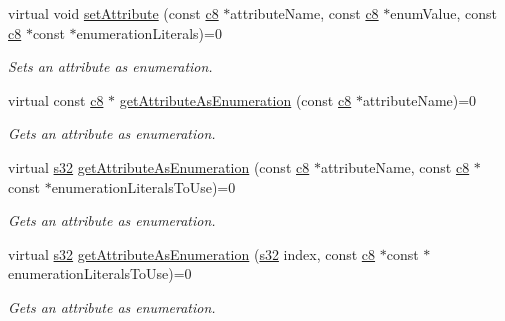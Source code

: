 \begin{DoxyCompactItemize}
\mbox{\label{classirr_1_1io_1_1IAttributes_a4670e9270e610770245b2109c2b49597}} 
virtual void \hyperlink{classirr_1_1io_1_1IAttributes_a4670e9270e610770245b2109c2b49597}{set\+Attribute} (const \hyperlink{namespaceirr_a9395eaea339bcb546b319e9c96bf7410}{c8} $\ast$attribute\+Name, const \hyperlink{namespaceirr_a9395eaea339bcb546b319e9c96bf7410}{c8} $\ast$enum\+Value, const \hyperlink{namespaceirr_a9395eaea339bcb546b319e9c96bf7410}{c8} $\ast$const $\ast$enumeration\+Literals)=0
\begin{DoxyCompactList}\small\item\em Sets an attribute as enumeration. \end{DoxyCompactList}\item 
virtual const \hyperlink{namespaceirr_a9395eaea339bcb546b319e9c96bf7410}{c8} $\ast$ \hyperlink{classirr_1_1io_1_1IAttributes_a2a204c332735a0b15fa555ae6e785214}{get\+Attribute\+As\+Enumeration} (const \hyperlink{namespaceirr_a9395eaea339bcb546b319e9c96bf7410}{c8} $\ast$attribute\+Name)=0
\begin{DoxyCompactList}\small\item\em Gets an attribute as enumeration. \end{DoxyCompactList}\item 
virtual \hyperlink{namespaceirr_ac66849b7a6ed16e30ebede579f9b47c6}{s32} \hyperlink{classirr_1_1io_1_1IAttributes_a77c6a5fba661a85701986382df7d13b3}{get\+Attribute\+As\+Enumeration} (const \hyperlink{namespaceirr_a9395eaea339bcb546b319e9c96bf7410}{c8} $\ast$attribute\+Name, const \hyperlink{namespaceirr_a9395eaea339bcb546b319e9c96bf7410}{c8} $\ast$const $\ast$enumeration\+Literals\+To\+Use)=0
\begin{DoxyCompactList}\small\item\em Gets an attribute as enumeration. \end{DoxyCompactList}\item 
virtual \hyperlink{namespaceirr_ac66849b7a6ed16e30ebede579f9b47c6}{s32} \hyperlink{classirr_1_1io_1_1IAttributes_a906b34ac742d3418d16afcf1d1e2aaa4}{get\+Attribute\+As\+Enumeration} (\hyperlink{namespaceirr_ac66849b7a6ed16e30ebede579f9b47c6}{s32} index, const \hyperlink{namespaceirr_a9395eaea339bcb546b319e9c96bf7410}{c8} $\ast$const $\ast$enumeration\+Literals\+To\+Use)=0
\begin{DoxyCompactList}\small\item\em Gets an attribute as enumeration. \end{DoxyCompactList}\item 

\end{DoxyCompactItemize}
